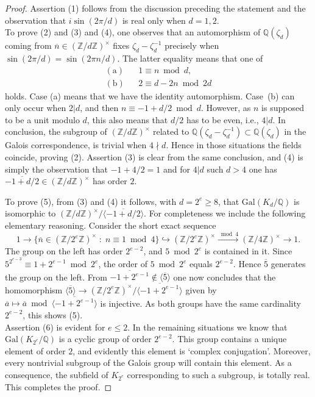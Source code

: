 \documentclass[a4paper,12pt]{amsart}
\newcommand{\ZZ}{{\mathbb Z}}
\newcommand{\QQ}{{\mathbb Q}}
\numberwithin{equation}{section}
\theoremstyle{plain}
\numberwithin{thm}{section}
\begin{document}
\begin{proof}
  Assertion (1) follows from the discussion preceding the
  statement and the observation that $i\sin(2\pi/d)$ is real
  only when $d=1,2$.\\
  To prove (2) and (3) and (4), one observes that an automorphism of $\QQ(\zeta_d)$
  coming from $\overline{n}\in (\ZZ/d\ZZ)^\times$ fixes $\zeta_d-\zeta_d^{-1}$
  precisely when $\sin(2\pi/d)=\sin(2\pi n/d)$. The latter equality means
  that one of 
  \[\begin{array}{ccl} (\textrm{a}) &&1\equiv n\bmod d,\\ (\textrm{b})&&2\equiv d-2n\bmod 2d\end{array} \]
  holds. Case (a) means that we have the identity automorphism.
  Case~(b) can only occur when $2|d$, and then $n\equiv -1+d/2\bmod d$. However,
  as $n$ is supposed to be a unit modulo $d$, this also means that $d/2$ has
  to be even, i.e., $4|d$. In conclusion, the subgroup of $(\ZZ/d\ZZ)^\times$
  related to $\QQ(\zeta_d-\zeta_d^{-1})\subset\QQ(\zeta_d)$ in the 
  Galois correspondence, is trivial when $4\nmid d$. Hence in those
  situations the fields coincide, proving (2). Assertion (3) is clear from
  the same conclusion, and (4) is simply the observation that
  $-1+4/2=1$ and for $4|d$ such $d>4$ one has $\overline{-1+d/2}\in (\ZZ/d\ZZ)^\times$ has order $2$.

  To prove (5), from (3) and (4) it follows, with $d=2^e\geq 8$, that $\textrm{Gal}(K_d/\QQ)$ is isomorphic to $(\ZZ/d\ZZ)^\times/\langle \overline{-1+d/2}\rangle$.
  For completeness we include the following elementary reasoning. Consider
  the short exact sequence
  \[ 1\to \{\overline{n}\in (\ZZ/2^e\ZZ)^\times\;:\;n\equiv 1\bmod 4\}\hookrightarrow (\ZZ/2^e\ZZ)^\times\stackrel{\bmod 4}{\longrightarrow}
  (\ZZ/4\ZZ)^\times\to 1.\]
  The group on the left has order $2^{e-2}$, and $5\bmod 2^e$ is contained in it.
  Since $5^{2^{e-3}}\equiv 1+2^{e-1}\bmod 2^e$, the order of $5\bmod 2^e$
  equals $2^{e-2}$. Hence $\overline{5}$ generates the group on the left.
  From $\overline{-1+2^{e-1}}\not\in\langle \overline{5}\rangle$ one now
  concludes that the homomorphism $\langle \overline{5}\rangle \to
  (\ZZ/2^e\ZZ)^\times/\langle \overline{-1+2^{e-1}}\rangle$ given by
  $\overline{a}\mapsto \overline{a}\bmod \langle \overline{-1+2^{e-1}}\rangle$
  is injective. As both groups have the same cardinality $2^{e-2}$, this 
  shows (5).\\
  Assertion (6) is evident for $e\leq 2$. In the remaining situations we know
  that $\textrm{Gal}(K_{2^e}/\QQ)$ is a cyclic group of order $2^{e-2}$.
  This group contains a unique element of order $2$, and evidently this
  element is `complex conjugation'. Moreover, every nontrivial
  subgroup of the Galois group will contain this element. As a consequence,
  the subfield of $K_{2^e}$ corresponding to such a subgroup, is totally real.
  This completes the proof.
\end{proof}
\end{document}
